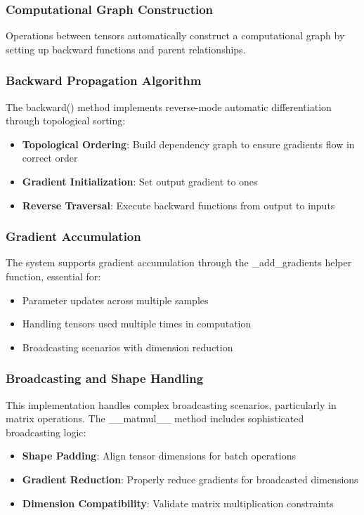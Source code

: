 \documentclass[conference]{IEEEtran}
\begin{document}
\subsubsection{Computational Graph Construction}
Operations between tensors automatically construct a computational graph by setting up backward functions and parent relationships.

\subsubsection{Backward Propagation Algorithm}
The backward() method implements reverse-mode automatic differentiation through topological sorting:
\begin{itemize}
\item \textbf{Topological Ordering}: Build dependency graph to ensure gradients flow in correct order
\item \textbf{Gradient Initialization}: Set output gradient to ones
\item \textbf{Reverse Traversal}: Execute backward functions from output to inputs
\end{itemize}

\subsubsection{Gradient Accumulation}
The system supports gradient accumulation through the \_add\_gradients helper function, essential for:
\begin{itemize}
\item Parameter updates across multiple samples
\item Handling tensors used multiple times in computation
\item Broadcasting scenarios with dimension reduction
\end{itemize}

\subsubsection{Broadcasting and Shape Handling}
This implementation handles complex broadcasting scenarios, particularly in matrix operations. The \_\_matmul\_\_ method includes sophisticated broadcasting logic:
\begin{itemize}
\item \textbf{Shape Padding}: Align tensor dimensions for batch operations
\item \textbf{Gradient Reduction}: Properly reduce gradients for broadcasted dimensions
\item \textbf{Dimension Compatibility}: Validate matrix multiplication constraints
\end{itemize}
\end{document}
